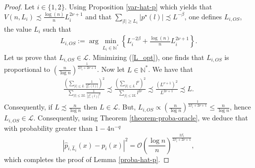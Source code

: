 \documentclass[11pt,a4paper,openany]{article}
\def\N{\mathbb{N}}
\begin{document}
\begin{proof}

Let $i \in \{1, 2 \}$. Using Proposition \ref{var-hat-p} which yields that  $V(n,L_i) \precsim \frac{\log(n)}{n} L_i^{2\nu +1}$ and that $\sum_{|l| \geq L_i} |p^\star(l)|  \precsim L^{-\beta }$, one  defines $L_{i, {OS}}$, the value $L_i$ such that 
\begin{eqnarray}\label{L_opt}
L_{i, {OS}} := \arg \min_{L_i \in \N^*} \left \{ L_i^{-2\beta} + \frac{\log(n)}{n} L_i^{2\nu +1}  \right \}.
\end{eqnarray}
Let us prove that  $ L_{i, { OS}} \in \mathcal{L}$. Minimizing (\ref{L_opt}), one finds that $L_{i, { OS}}$  is proportional to $(\frac{n}{\log n})^{\frac{1}{2\beta_i + 2 \nu +1 }}$. Now let $L \in \mathbb{N}^*$. We have that
\begin{eqnarray*}
 \frac{  \left (\sum_{ | l | \leq L}  \frac{1}{ |f^\star_{\varepsilon}(l)| } \right )^2}{\sum_{|l | \leq 2L }   \frac{1}{ |f^\star_{\varepsilon}(l)|^2}} \precsim \frac{  \left (\sum_{ | l | \leq L} l^{\nu}\right )^2 }{ \sum_{|l | \leq 2L } l^{2\nu}}
  \precsim  \frac{(L^{\nu+1})^2}{L^{2\nu+1}} \precsim L. 
\end{eqnarray*}
Consequently, if $L \precsim \frac{n}{\log n}$ then $L \in \mathcal{L}$. But, $ L_{i, { OS}}  \varpropto (\frac{n}{\log n})^{\frac{1}{2\beta_i + 2 \nu +1 }} \leq  \frac{n}{\log n} $, hence $ L_{i, { OS}} \in \mathcal{L}$.
Consequently, using Theorem \ref{theorem-proba-oracle}, we deduce that with probability greater than $1-4n^{-q}$
\begin{equation*}
| \widehat p_{i, \hat L_i}(x) -p_i(x)|^2 = \mathcal{O} \left (\frac{\log n}{n} \right)^{\frac{2\beta_i}{2\beta_i + 2\nu +1}},
\end{equation*}
which completes the proof of Lemma \ref{proba-hat-p}.

\end{proof}
\end{document}
